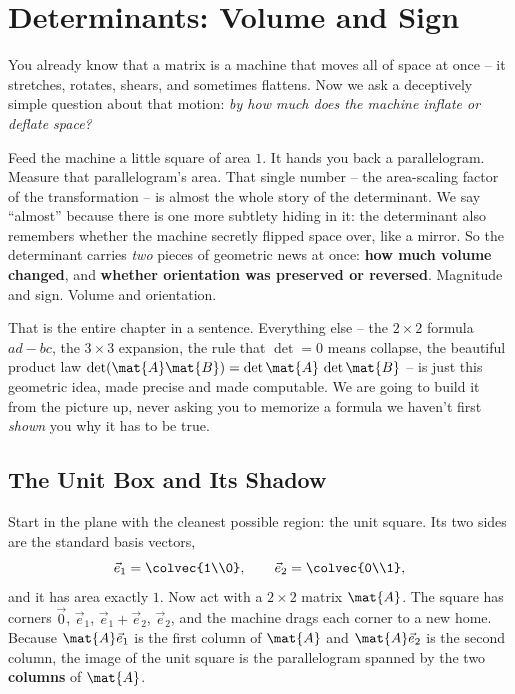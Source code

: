 \chapter{Determinants: Volume and Sign}

You already know that a matrix is a machine that moves all of space at once --
it stretches, rotates, shears, and sometimes flattens. Now we ask a deceptively
simple question about that motion: \emph{by how much does the machine inflate or
deflate space?}

Feed the machine a little square of area $1$. It hands you back a parallelogram.
Measure that parallelogram's area. That single number -- the area-scaling factor
of the transformation -- is almost the whole story of the determinant. We say
``almost'' because there is one more subtlety hiding in it: the determinant also
remembers whether the machine secretly flipped space over, like a mirror. So the
determinant carries \emph{two} pieces of geometric news at once: \textbf{how much
volume changed}, and \textbf{whether orientation was preserved or reversed}.
Magnitude and sign. Volume and orientation.

That is the entire chapter in a sentence. Everything else -- the $2\times 2$
formula $ad-bc$, the $3\times 3$ expansion, the rule that $\det = 0$ means
collapse, the beautiful product law $\det(\mat{A}\mat{B}) = \det\mat{A}\,\det\mat{B}$
-- is just this geometric idea, made precise and made computable. We are going to
build it from the picture up, never asking you to memorize a formula we haven't
first \emph{shown} you why it has to be true.

\section{The Unit Box and Its Shadow}
\label{ch21:unit-box}

Start in the plane with the cleanest possible region: the unit square. Its two
sides are the standard basis vectors,
\[
  \vec{e}_1 = \colvec{1\\0}, \qquad \vec{e}_2 = \colvec{0\\1},
\]
and it has area exactly $1$. Now act with a $2\times 2$ matrix $\mat{A}$. The
square has corners $\vec{0}$, $\vec{e}_1$, $\vec{e}_1+\vec{e}_2$, $\vec{e}_2$, and
the machine drags each corner to a new home. Because $\mat{A}\vec{e}_1$ is the
first column of $\mat{A}$ and $\mat{A}\vec{e}_2$ is the second column, the image
of the unit square is the parallelogram spanned by the two \textbf{columns} of
$\mat{A}$.

